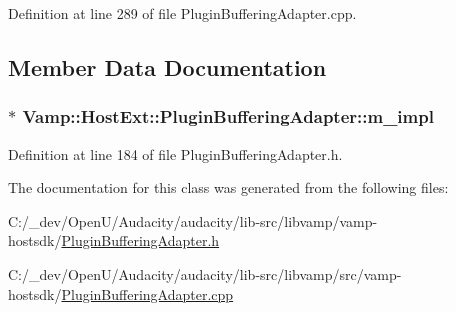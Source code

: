 Definition at line 289 of file Plugin\+Buffering\+Adapter.\+cpp.



\subsection{Member Data Documentation}
\subsubsection[{\texorpdfstring{m\+\_\+impl}{m_impl}}]{$\ast$ Vamp\+::\+Host\+Ext\+::\+Plugin\+Buffering\+Adapter\+::m\+\_\+impl\hspace{0.3cm}{\ttfamily [protected]}}\hypertarget{class_vamp_1_1_host_ext_1_1_plugin_buffering_adapter_a51e10c9c63c0349fd74c6d604de5554e}{}\label{class_vamp_1_1_host_ext_1_1_plugin_buffering_adapter_a51e10c9c63c0349fd74c6d604de5554e}


Definition at line 184 of file Plugin\+Buffering\+Adapter.\+h.



The documentation for this class was generated from the following files\+:\begin{DoxyCompactItemize}
\item 
C\+:/\+\_\+dev/\+Open\+U/\+Audacity/audacity/lib-\/src/libvamp/vamp-\/hostsdk/\hyperlink{_plugin_buffering_adapter_8h}{Plugin\+Buffering\+Adapter.\+h}\item 
C\+:/\+\_\+dev/\+Open\+U/\+Audacity/audacity/lib-\/src/libvamp/src/vamp-\/hostsdk/\hyperlink{_plugin_buffering_adapter_8cpp}{Plugin\+Buffering\+Adapter.\+cpp}\end{DoxyCompactItemize}
